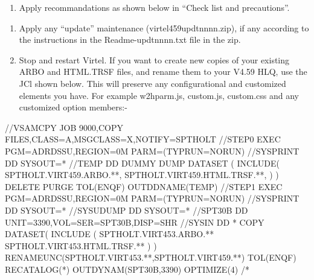\documentclass[letterpaper,10pt,english]{sphinxmanual}
\begin{document}
\begin{enumerate}
\def\theenumi{\arabic{enumi}}
\def\labelenumi{\theenumi .}
\makeatletter\def\p@enumii{\p@enumi \theenumi .}\makeatother
\setcounter{enumi}{10}
\item {} 
Apply recommandations as shown below in “Check list and precautions”.

\end{enumerate}

\newpage
\begin{enumerate}
\def\theenumi{\arabic{enumi}}
\def\labelenumi{\theenumi .}
\makeatletter\def\p@enumii{\p@enumi \theenumi .}\makeatother
\setcounter{enumi}{11}
\item {} 
Apply any “update” maintenance (virtel459updtnnnn.zip), if any according to the instructions in the Readme-updtnnnn.txt file in the zip.

\item {} 
Stop and restart Virtel. If you want to create new copies of your existing ARBO and HTML.TRSF files, and rename them to your V4.59 HLQ, use the JCl shown below. This will preserve any configurational and customized elements you have. For example w2hparm.js, custom.js, custom.css and any customized option members:-

\end{enumerate}

\begin{sphinxVerbatim}[commandchars=\\\{\}]
//\PYGZdl{}VSAMCPY JOB 9000,\PYGZsq{}COPY FILES\PYGZsq{},CLASS=A,MSGCLASS=X,NOTIFY=SPTHOLT
//STEP0   EXEC PGM=ADRDSSU,REGION=0M PARM=(\PYGZsq{}TYPRUN=NORUN\PYGZsq{})
//SYSPRINT DD SYSOUT=*
//TEMP DD DUMMY
 DUMP DATASET              \PYGZhy{}
      (                    \PYGZhy{}
       INCLUDE(            \PYGZhy{}
      SPTHOLT.VIRT459.ARBO.**, \PYGZhy{}
      SPTHOLT.VIRT459.HTML.TRSF.**, \PYGZhy{}
                )         \PYGZhy{}
      )                   \PYGZhy{}
      DELETE    \PYGZhy{}
      PURGE      \PYGZhy{}
      TOL(ENQF) \PYGZhy{}
      OUTDDNAME(TEMP)
//STEP1   EXEC PGM=ADRDSSU,REGION=0M PARM=(\PYGZsq{}TYPRUN=NORUN\PYGZsq{})
//SYSPRINT DD  SYSOUT=*
//SYSUDUMP DD  SYSOUT=*
//SPT30B   DD  UNIT=3390,VOL=SER=SPT30B,DISP=SHR
//SYSIN    DD  *
 COPY                                             \PYGZhy{}
       DATASET(                                   \PYGZhy{}
       INCLUDE (                                  \PYGZhy{}
       SPTHOLT.VIRT453.ARBO.**                    \PYGZhy{}
       SPTHOLT.VIRT453.HTML.TRSF.**               \PYGZhy{}
  )                                               \PYGZhy{}
  )\PYGZhy{}
  RENAMEUNC(SPTHOLT.VIRT453.**,SPTHOLT.VIRT459.**) \PYGZhy{}
  TOL(ENQF)   \PYGZhy{}
  RECATALOG(*) \PYGZhy{}
  OUTDYNAM(SPT30B,3390) \PYGZhy{}
  OPTIMIZE(4)
/*
\end{sphinxVerbatim}
\end{document}
